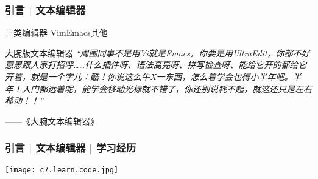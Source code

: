 \begin{frame}
  \frametitle{引言 | 文本编辑器}
  \begin{block}{三类编辑器}
    Vim\qquad Emacs\qquad 其他
  \end{block}
  \pause
  \begin{block}{大腕版文本编辑器}
  \textit{“周围同事不是用Vi就是Emacs，你要是用UltraEdit，你都不好意思跟人家打招呼……什么插件呀、语法高亮呀、拼写检查呀、能给它开的都给它开着，就是一个字儿：酷！你说这么牛X一东西，怎么着学会也得小半年吧。半年！入门都远着呢，能学会移动光标就不错了，你还别说耗不起，就这还只是左右移动！！” }
  \begin{flushright}
    ——《大腕\textbullet 文本编辑器》
  \end{flushright}
\end{block}
\end{frame}

\begin{frame}
  \frametitle{引言 | 文本编辑器 | 学习经历}
  \begin{center}
    \texttt{[image: c7.learn.code.jpg]}
  \end{center}
\end{frame}

